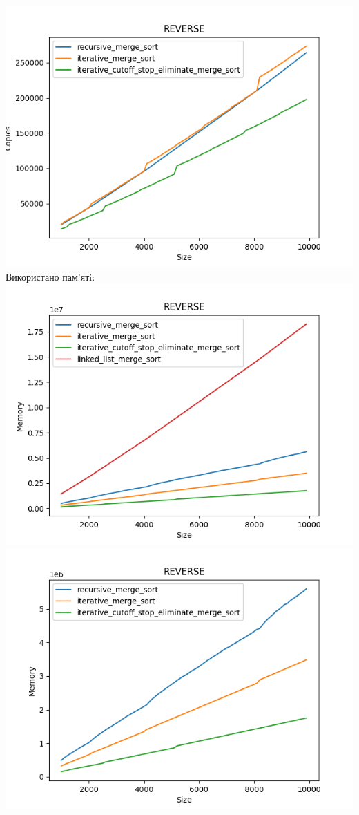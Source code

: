 \documentclass{article}
\begin{document}
            \includegraphics[scale=0.5]{reverse_Copies_3_sorts_90_numbers_50.png}
        \newline
        Використано пам’ятi:
        \newline
            \includegraphics[scale=0.5]{reverse_Memory_4_sorts_90_numbers_50.png}
            \includegraphics[scale=0.5]{reverse_Memory_3_sorts_90_numbers_50.png}
\end{document}
